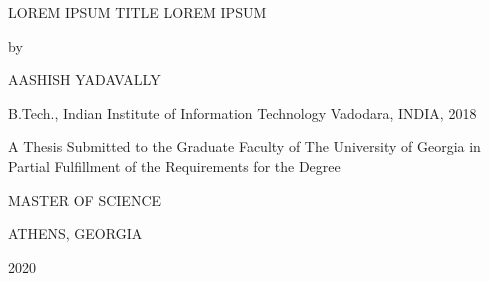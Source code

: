 \thispagestyle{empty}

\begin{center}
    LOREM IPSUM TITLE LOREM IPSUM
    
    \vspace*{2\baselineskip}
    by

    \vspace*{2\baselineskip}
    AASHISH YADAVALLY
    
    B.Tech., Indian Institute of Information Technology Vadodara, INDIA, 2018
    \vspace*{4\baselineskip}

    A Thesis Submitted to the Graduate Faculty of The University of Georgia
    in Partial Fulfillment of the Requirements for the Degree
    \vspace*{3\baselineskip}

    MASTER OF SCIENCE
    \vspace*{3\baselineskip}

    ATHENS, GEORGIA
    
    2020
\end{center}

\newpage
